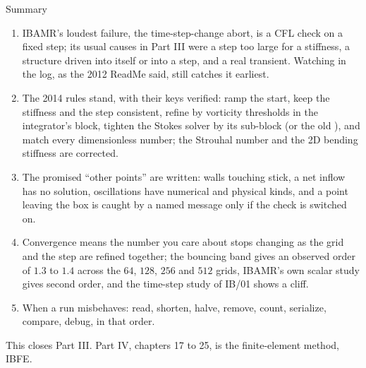 \documentclass[aspectratio=169,11pt]{beamer}
\begin{document}
\begin{frame}{Summary}
\label{fr:summary}
\footnotesize
\begin{enumerate}
  \item IBAMR's loudest failure, the time-step-change abort, is a CFL check on a fixed step; its usual causes in Part III were a step too large for a stiffness, a structure driven into itself or into a step, and a real transient. Watching  in the log, as the 2012 ReadMe said, still catches it earliest.
  \item The 2014 rules stand, with their keys verified: ramp the start, keep the stiffness and the step consistent, refine by vorticity thresholds in the integrator's block, tighten the Stokes solver by its sub-block (or the old ), and match every dimensionless number; the Strouhal number and the 2D bending stiffness are corrected.
  \item The promised ``other points'' are written: walls touching stick, a net inflow has no solution, oscillations have numerical and physical kinds, and a point leaving the box is caught by a named message only if the check is switched on.
  \item Convergence means the number you care about stops changing as the grid and the step are refined together; the bouncing band gives an observed order of $1.3$ to $1.4$ across the $64$, $128$, $256$ and $512$ grids, IBAMR's own scalar study gives second order, and the time-step study of IB/01 shows a cliff.
  \item When a run misbehaves: read, shorten, halve, remove, count, serialize, compare, debug, in that order.
\end{enumerate}
\begin{homebox}
\footnotesize This closes Part III. Part IV, chapters 17 to 25, is the finite-element method, IBFE.
\end{homebox}
\end{frame}
\end{document}
